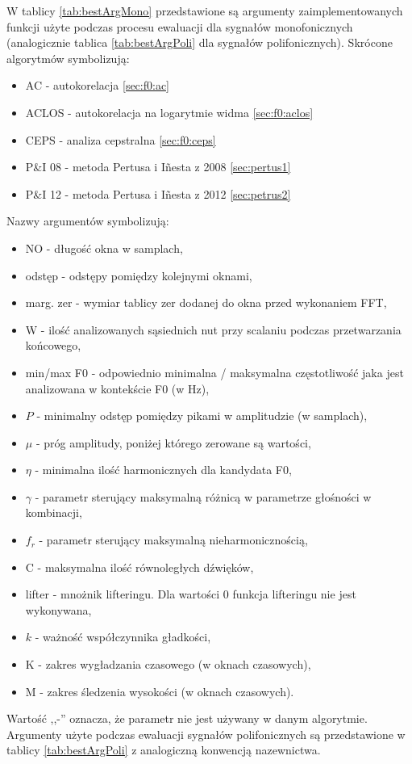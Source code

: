 \documentclass[12pt,a4paper,twoside]{mwart}
\begin{document}
W tablicy \ref{tab:bestArgMono} przedstawione są argumenty zaimplementowanych funkcji użyte podczas procesu ewaluacji dla sygnałów monofonicznych (analogicznie tablica \ref{tab:bestArgPoli} dla sygnałów polifonicznych). Skrócone algorytmów symbolizują: 
\begin{itemize}
  \item AC - autokorelacja \ref{sec:f0:ac}
  \item ACLOS - autokorelacja na logarytmie widma \ref{sec:f0:aclos}
  \item CEPS - analiza cepstralna \ref{sec:f0:ceps}
  \item P\&I 08 - metoda Pertusa i Iñesta z 2008 \ref{sec:pertus1}
  \item P\&I 12 - metoda Pertusa i Iñesta z 2012 \ref{sec:petrus2}
\end{itemize}
Nazwy argumentów symbolizują:
\begin{itemize}
  \item NO - długość okna w samplach,
  \item odstęp - odstępy pomiędzy kolejnymi oknami,
  \item marg. zer - wymiar tablicy zer dodanej do okna przed wykonaniem FFT,
  \item W - ilość analizowanych sąsiednich nut przy scalaniu podczas przetwarzania końcowego,
  \item min/max F0 - odpowiednio minimalna / maksymalna częstotliwość jaka jest analizowana w kontekście F0 (w Hz),
  \item $P$ - minimalny odstęp pomiędzy pikami w amplitudzie (w samplach),
  \item $\mu$ - próg amplitudy, poniżej którego zerowane są wartości,
  \item $\eta$ - minimalna ilość harmonicznych dla kandydata F0,
  \item $\gamma$ - parametr sterujący maksymalną różnicą w parametrze głośności w kombinacji,
  \item $f_r$ - parametr sterujący maksymalną nieharmonicznością,
  \item C - maksymalna ilość równoległych dźwięków,
  \item lifter - mnożnik lifteringu. Dla wartości 0 funkcja lifteringu nie jest wykonywana,
  \item $k$ - ważność współczynnika gładkości,
  \item K - zakres wygładzania czasowego (w oknach czasowych),
  \item M - zakres śledzenia wysokości (w oknach czasowych).
\end{itemize}
Wartość ,,-'' oznacza, że parametr nie jest używany w danym algorytmie. Argumenty użyte podczas ewaluacji sygnałów polifonicznych są przedstawione w tablicy \ref{tab:bestArgPoli} z analogiczną konwencją nazewnictwa.
\end{document}

